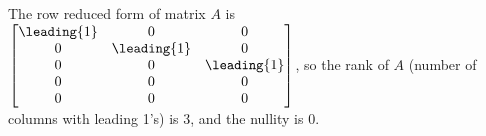 The row reduced form of matrix $A$ is 
$\begin{bmatrix} 
\leading{1} & 0 & 0\\ 
0 & \leading{1} & 0\\ 
0 & 0 & \leading{1}\\ 
0  & 0 & 0\\ 
0 & 0 & 0
\end{bmatrix}$, 
so the rank of $A$ (number of columns with leading 1's) is $3$, and the nullity is $0$.
